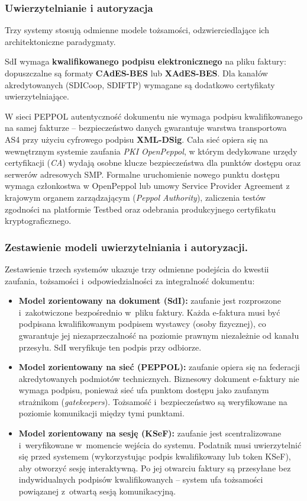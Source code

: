 \subsubsection{Uwierzytelnianie i autoryzacja}
\label{sec:porownanie-uwierzytelnianie-autoryzacja}

Trzy systemy stosują odmienne modele tożsamości, odzwierciedlające ich architektoniczne paradygmaty.

SdI wymaga \textbf{kwalifikowanego podpisu elektronicznego} na pliku faktury: dopuszczalne są formaty \textbf{CAdES-BES} lub \textbf{XAdES-BES}. Dla kanałów akredytowanych (SDICoop, SDIFTP) wymagane są dodatkowo certyfikaty uwierzytelniające. \cite{agenziaentrate-come-fare-fattura,sdi-fatturapa-accreditamento,sdi-fatturapa-regole-tecniche}

W sieci PEPPOL autentyczność dokumentu nie wymaga podpisu kwalifikowanego na samej fakturze -- bezpieczeństwo danych gwarantuje warstwa transportowa AS4 przy użyciu cyfrowego podpisu \textbf{XML-DSig}. Cała sieć opiera się na wewnętrznym systemie zaufania \textit{PKI OpenPeppol}, w którym dedykowane urzędy certyfikacji (\textit{CA}) wydają osobne klucze bezpieczeństwa dla punktów dostępu oraz serwerów adresowych SMP. Formalne uruchomienie nowego punktu dostępu wymaga członkostwa w OpenPeppol lub umowy Service Provider Agreement z krajowym organem zarządzającym (\textit{Peppol Authority}), zaliczenia testów zgodności na platformie Testbed oraz odebrania produkcyjnego certyfikatu kryptograficznego. \cite{peppol-pki-2025}

\subsubsection*{Zestawienie modeli uwierzytelniania i autoryzacji.}

Zestawienie trzech systemów ukazuje trzy odmienne podejścia do kwestii zaufania, tożsamości i~odpowiedzialności za integralność dokumentu:
\begin{itemize}
    \item \textbf{Model zorientowany na dokument (SdI):} zaufanie jest rozproszone i~zakotwiczone bezpośrednio w~pliku faktury. Każda e-faktura musi być podpisana kwalifikowanym podpisem wystawcy (osoby fizycznej), co gwarantuje jej niezaprzeczalność na poziomie prawnym niezależnie od kanału przesyłu. SdI weryfikuje ten podpis przy odbiorze.
    \item \textbf{Model zorientowany na sieć (PEPPOL):} zaufanie opiera się na federacji akredytowanych podmiotów technicznych. Biznesowy dokument e-faktury nie wymaga podpisu, ponieważ sieć ufa punktom dostępu jako zaufanym strażnikom (\textit{gatekeepers}). Tożsamość i~bezpieczeństwo są weryfikowane na poziomie komunikacji między tymi punktami.
    \item \textbf{Model zorientowany na sesję (KSeF):} zaufanie jest scentralizowane i~weryfikowane w~momencie wejścia do systemu. Podatnik musi uwierzytelnić się przed systemem (wykorzystując podpis kwalifikowany lub token KSeF), aby otworzyć sesję interaktywną. Po jej otwarciu faktury są przesyłane bez indywidualnych podpisów kwalifikowanych -- system ufa tożsamości powiązanej z~otwartą sesją komunikacyjną.
\end{itemize}

